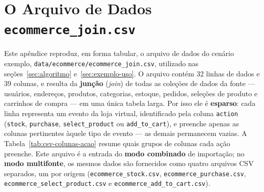 \chapter{O Arquivo de Dados \texttt{ecommerce\_join.csv}}
\label{ap:csv}

Este apêndice reproduz, em forma tabular, o arquivo de dados do cenário exemplo,
\texttt{data/ecommerce/ecommerce\_join.csv}, utilizado nas seções~\ref{sec:algoritmo}
e~\ref{sec:exemplo-uso}. O arquivo contém 32 linhas de dados e 39 colunas, e resulta da
\textbf{junção} (\textit{join}) de todas as coleções de dados da fonte --- usuários,
endereços, produtos, categorias, estoque, pedidos, seleções de produto e carrinhos de
compra --- em uma única tabela larga. Por isso ele é \textbf{esparso}: cada linha
representa um evento da loja virtual, identificado pela coluna \texttt{action}
(\texttt{stock}, \texttt{purchase}, \texttt{select\_product} ou \texttt{add\_to\_cart}),
e preenche apenas as colunas pertinentes àquele tipo de evento --- as demais permanecem
vazias. A Tabela~\ref{tab:csv-colunas-acao} resume quais grupos de colunas cada ação
preenche. Este arquivo é a entrada do \textbf{modo combinado} de importação; no
\textbf{modo multifonte}, os mesmos dados são fornecidos como quatro arquivos CSV separados,
um por origem (\texttt{ecommerce\_stock.csv}, \texttt{ecommerce\_purchase.csv},
\texttt{ecommerce\_select\_product.csv} e \texttt{ecommerce\_add\_to\_cart.csv}).

